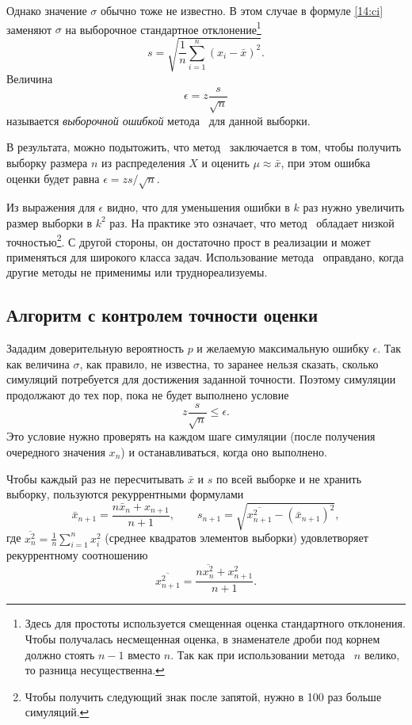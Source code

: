 Однако значение $\sigma$ обычно тоже не известно.
В этом случае в формуле \eqref{14:ci} заменяют $\sigma$ на выборочное стандартное отклонение\footnote{Здесь для простоты используется смещенная оценка стандартного отклонения.
Чтобы получалась несмещенная оценка, в знаменателе дроби под корнем должно стоять $n-1$ вместо $n$.
Так как при использовании метода \mc\ $n$ велико, то разница несущественна.}
\[
s = \sqrt{\frac1n \sum_{i=1}^n (x_i - \bar x)^2}.
\]
Величина
\begin{equation}
\label{mc:error}
\epsilon = z \frac{s}{\sqrt{n}}
\end{equation}
называется \emph{выборочной ошибкой} метода \mc\ для данной выборки.

В результата, можно подытожить, что метод \mc\ заключается в том, чтобы получить выборку размера $n$ из распределения $X$ и оценить $\mu\approx \bar x$, при этом ошибка оценки будет равна $\epsilon = z s/ \sqrt{n}$.

\begin{remark}
Из выражения для $\epsilon$ видно, что для уменьшения ошибки в $k$ раз нужно увеличить размер выборки в $k^2$ раз.
На практике это означает, что метод \mc\ обладает низкой точностью\footnote{Чтобы получить следующий знак после запятой, нужно в 100 раз больше симуляций.}.
С другой стороны, он достаточно прост в реализации и может применяться для широкого класса задач.
Использование метода \mc\ оправдано, когда другие методы не применимы или труднореализуемы.
\end{remark}


\subsection{Алгоритм с контролем точности оценки}

Зададим доверительную вероятность $p$ и желаемую максимальную ошибку $\epsilon$.
Так как величина $\sigma$, как правило, не известна, то заранее нельзя сказать, сколько симуляций потребуется для достижения заданной точности.
Поэтому симуляции продолжают до тех пор, пока не будет выполнено условие
\begin{equation}
\label{14:abs-error}
z \frac{s}{\sqrt{n}} \le \epsilon.
\end{equation}
Это условие нужно проверять на каждом шаге симуляции (после получения очередного значения $x_n$) и останавливаться, когда оно выполнено.

Чтобы каждый раз не пересчитывать $\bar x$ и $s$ по всей выборке и не хранить выборку, пользуются  рекуррентными формулами 
\[
\bar x_{n+1} = \frac{n \bar x_n + x_{n+1}}{n+1}, \qquad
s_{n+1} = \sqrt{\overline{x_{n+1}^2} - (\bar x_{n+1})^2},
\]
где $\overline{x_n^2} =\frac 1n \sum\limits_{i=1}^n x_i^2$ (среднее квадратов элементов выборки) удовлетворяет рекуррентному соотношению
\[
\overline{x_{n+1}^2} = \frac{n\overline{x_n^2} + x_{n+1}^2}{n+1}.
\]


